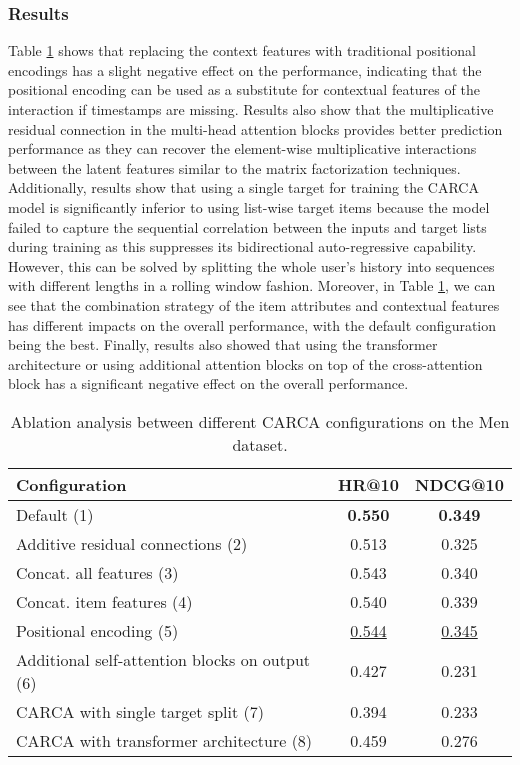 \documentclass[sigconf,natbib=true]{acmart}
\begin{document}
\subsubsection{Results}
Table \ref{Abl} shows that replacing the context features with traditional positional encodings has a slight negative effect on the performance, indicating that the positional encoding can be used as a substitute for contextual features of the interaction if timestamps are missing. Results also show that the multiplicative residual connection in the multi-head attention blocks provides better prediction performance as they can recover the element-wise multiplicative interactions between the latent features similar to the matrix factorization techniques. Additionally, results show that using a single target for training the CARCA model is significantly inferior to using list-wise target items because the model failed to capture the sequential correlation between the inputs and target lists during training as this suppresses its bidirectional auto-regressive capability. However, this can be solved by splitting the whole user's history into sequences with different lengths in a rolling window fashion. Moreover, in Table \ref{Abl}, we can see that the combination strategy of the item attributes and contextual features has different impacts on the overall performance, with the default configuration being the best.
Finally, results also showed that using the transformer architecture or using additional attention blocks on top of the cross-attention block has a significant negative effect on the overall performance.

\begin{table}[!ht]
\caption{Ablation analysis between different CARCA configurations on the Men dataset.}

\label{Abl}
\small
\begin{center}
\begin{tabular}{lcc}
\toprule

                       Configuration              & HR@10 & NDCG@10   \\
 \midrule                      
Default (1)                                            &\textbf{ 0.550 }& \textbf{0.349} \\
Additive residual connections (2)                  & 0.513 & 0.325 \\
Concat. all features (3)                            & 0.543 & 0.340 \\
Concat. item features (4)     & 0.540 & 0.339 \\
Positional encoding (5)                            & \underline{0.544} & \underline{0.345} \\
Additional self-attention blocks on output (6) &0.427 & 0.231	 \\
CARCA with single target split (7) & 0.394 & 0.233	 \\
CARCA with transformer architecture (8) & 0.459  &  0.276 	 \\
\bottomrule
\end{tabular}
  \end{center}
\end{table}
\end{document}

